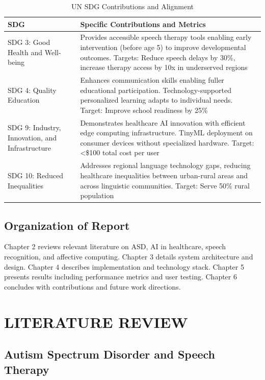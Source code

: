 \documentclass[12pt,a4paper]{article}
\begin{document}
\begin{table}[H]
\centering
\caption{UN SDG Contributions and Alignment}
\label{tab:sdg_contributions}
\small
\begin{tabular}{p{3cm}p{10.5cm}}
\toprule
\textbf{SDG} & \textbf{Specific Contributions and Metrics} \\
\midrule
SDG 3: Good Health and Well-being & Provides accessible speech therapy tools enabling early intervention (before age 5) to improve developmental outcomes. Targets: Reduce speech delays by 30\%, increase therapy access by 10x in underserved regions \\
\hline
SDG 4: Quality Education & Enhances communication skills enabling fuller educational participation. Technology-supported personalized learning adapts to individual needs. Target: Improve school readiness by 25\% \\
\hline
SDG 9: Industry, Innovation, and Infrastructure & Demonstrates healthcare AI innovation with efficient edge computing infrastructure. TinyML deployment on consumer devices without specialized hardware. Target: <\$100 total cost per user \\
\hline
SDG 10: Reduced Inequalities & Addresses regional language technology gaps, reducing healthcare inequalities between urban-rural areas and across linguistic communities. Target: Serve 50\% rural population \\
\bottomrule
\end{tabular}
\end{table}

\subsection{Organization of Report}

Chapter 2 reviews relevant literature on ASD, AI in healthcare, speech recognition, and affective computing. Chapter 3 details system architecture and design. Chapter 4 describes implementation and technology stack. Chapter 5 presents results including performance metrics and user testing. Chapter 6 concludes with contributions and future work directions.

\section{LITERATURE REVIEW}

\subsection{Autism Spectrum Disorder and Speech Therapy}
\end{document}
